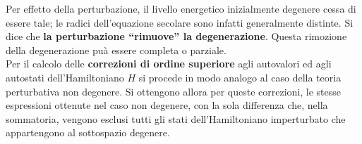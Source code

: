 Per effetto della perturbazione, il livello energetico inizialmente degenere cessa di essere tale; le radici dell'equazione secolare sono infatti generalmente distinte. Si dice che \textbf{la perturbazione ``rimuove'' la degenerazione}. Questa rimozione della degenerazione puà essere completa o parziale.\\

Per il calcolo delle \textbf{correzioni di ordine superiore} agli autovalori ed agli autostati dell'Hamiltoniano $H$ si procede in modo analogo al caso della teoria perturbativa non degenere. Si ottengono allora per queste correzioni, le stesse espressioni ottenute nel caso non degenere, con la sola differenza che, nella sommatoria, vengono esclusi tutti gli stati dell'Hamiltoniano imperturbato che appartengono al sottospazio degenere.
